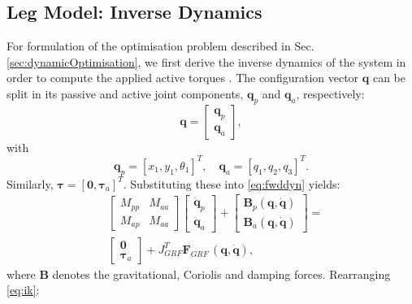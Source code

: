 \documentclass[letterpaper, 10 pt, conference]{ieeeconf}  %
\begin{document}
\subsection{Leg Model: Inverse Dynamics}
For formulation of the optimisation problem described in Sec. \ref{sec:dynamicOptimisation}, we first derive the inverse dynamics of the system in order to compute the applied active torques \cite{nakanishi2007inverse}. The configuration vector $\mathbf{q}$ can be split in its passive and active joint components, $\mathbf{q}_p$ and $\mathbf{q}_a$, respectively:
\begin{equation}
\mathbf{q} =
\begin{bmatrix}
	\mathbf{q}_p \\
	\mathbf{q}_a
\end{bmatrix},
\end{equation}
with
\begin{equation}
\mathbf{q}_p = [x_1,y_1,\theta_1]^T, \quad  
\mathbf{q}_a = [q_1,q_2,q_3]^T.
\end{equation}
\noindent
Similarly, $\boldsymbol{\tau} = \left[\mathbf{0},\boldsymbol{\tau}_a\right]^T$.
Substituting these into \eqref{eq:fwddyn} yields:
\begin{equation}
\begin{aligned}
&\left[\begin{array}{cc}  
M_{pp} & M_{aa}\\
M_{ap} & M_{aa}
\end{array} \right]
\left[\begin{array}{c}  
\mathbf{\ddot q}_p\\
\mathbf{\ddot q}_a
\end{array} \right] +
\left[\begin{array}{c}  
\mathbf{B}_p \mathbf{(q,\dot q)}\\
\mathbf{B}_a \mathbf{(q,\dot q)}
\end{array} \right] 
=\\
&\left[\begin{array}{c}  
\mathbf{0}\\
\boldsymbol{\tau}_a
\end{array} \right] 
+
J_{GRF}^T \mathbf{F}_{GRF} \, \mathbf{(q, \dot q)},
\end{aligned} \label{eq:ik}
\end{equation}		
where $\mathbf{B}$ denotes the gravitational, Coriolis and damping forces. 
Rearranging \eqref{eq:ik}:
\end{document}
